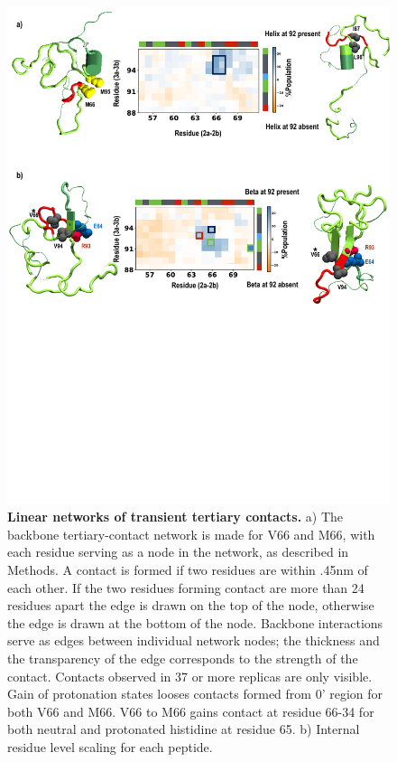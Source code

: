 \documentclass[10pt,letterpaper]{article}
\begin{document}
\begin{figure}[!ht]
\includegraphics[scale=0.5,width=12cm,trim={0 0cm 0 0cm},clip]{../figures/fig8.pdf}
\caption{{\bf Linear networks of transient tertiary contacts.} a) The backbone tertiary-contact network is made for V66 and M66, with each residue serving as a node in the network, as described in Methods. A contact is formed if two residues are within .45nm of each other. If the two residues forming contact are more than 24 residues apart the edge is drawn on the top of the node, otherwise the edge is drawn at the bottom of the node. Backbone interactions serve as edges between individual network nodes; the thickness  and the transparency of the edge corresponds to the strength of the contact. Contacts observed in 37 or more replicas are only visible.  Gain of protonation states looses contacts formed from 0' region for both V66 and M66. V66 to M66 gains contact at residue 66-34 for both neutral and protonated histidine at residue 65. b) Internal residue level scaling for each peptide.
 }
\label{fig8}
\end{figure}
\end{document}
